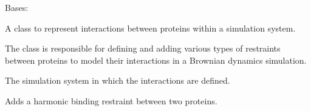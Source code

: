 \documentclass[letterpaper,10pt,english]{sphinxmanual}
\begin{document}

\begin{fulllineitems}
\label{\detokenize{src:src.Interaction_Class.Interaction}}
\pysigstartsignatures
{}
\pysigstopsignatures
\sphinxAtStartPar
Bases: 

\sphinxAtStartPar
A class to represent interactions between proteins within a simulation system.

\sphinxAtStartPar
The  class is responsible for defining and adding various types of
restraints between proteins to model their interactions in a Brownian dynamics
simulation.

\begin{fulllineitems}
\label{\detokenize{src:src.Interaction_Class.Interaction.system}}
\pysigstartsignatures
{}
\pysigstopsignatures
\sphinxAtStartPar
The simulation system in which the interactions are defined.
\begin{quote}\begin{description}
\sphinxAtStartPar
{\hyperref[\detokenize{src:src.System_Class.System}]{}}

\end{description}\end{quote}

\end{fulllineitems}


\begin{fulllineitems}
\label{\detokenize{src:src.Interaction_Class.Interaction.add_binding_restraint}}
\pysigstartsignatures
{}
\pysigstopsignatures
\sphinxAtStartPar
Adds a harmonic binding restraint between two proteins.


\end{fulllineitems}
\end{fulllineitems}
\end{document}
